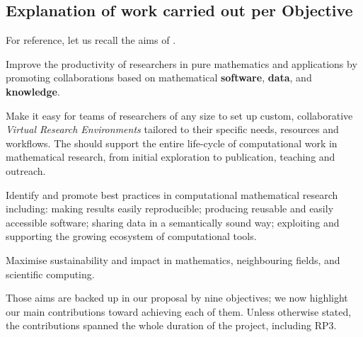 \subsection{Explanation of work carried out per Objective}
For reference, let us recall the aims of \ODK.
\begin{compactenum}[\bf {Aim} 1\rm]
\item \label{aim:collaboration} Improve the productivity of
  researchers in pure mathematics and applications by promoting
  collaborations based on mathematical \textbf{software},
  \textbf{data}, and \textbf{knowledge}.
\item \label{aim:vre} Make it easy for teams of researchers of any
  size to set up custom, collaborative \emph{Virtual Research
    Environments} tailored to their specific needs, resources and
  workflows. The \VREs should support the entire life-cycle of
  computational work in mathematical research, from initial
  exploration to publication, teaching and outreach.
\item \label{aim:sharing} Identify and promote best practices in
  computational mathematical research including: making results easily
  reproducible; producing reusable and easily accessible
  software; sharing data in a semantically sound way; exploiting and
  supporting the growing ecosystem of computational tools.
\item \label{aim:impact} Maximise sustainability and impact in
  mathematics, neighbouring fields, and scientific computing.
\end{compactenum}

Those aims are backed up in our proposal by nine objectives; we now
highlight our main contributions toward achieving each of them. Unless
otherwise stated, the contributions spanned the whole duration of the
project, including RP3.

